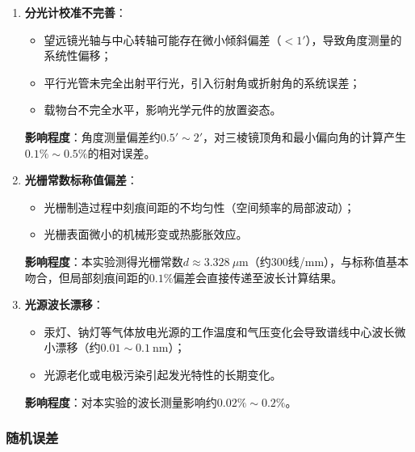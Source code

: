 \documentclass[11pt]{article}
\begin{document}
\begin{enumerate}
    \item \textbf{分光计校准不完善}：
    \begin{itemize}
        \item 望远镜光轴与中心转轴可能存在微小倾斜偏差（$< 1'$），导致角度测量的系统性偏移；
        \item 平行光管未完全出射平行光，引入衍射角或折射角的系统误差；
        \item 载物台不完全水平，影响光学元件的放置姿态。
    \end{itemize}
    \textbf{影响程度}：角度测量偏差约$0.5' \sim 2'$，对三棱镜顶角和最小偏向角的计算产生$0.1\% \sim 0.5\%$的相对误差。
    
    \item \textbf{光栅常数标称值偏差}：
    \begin{itemize}
        \item 光栅制造过程中刻痕间距的不均匀性（空间频率的局部波动）；
        \item 光栅表面微小的机械形变或热膨胀效应。
    \end{itemize}
    \textbf{影响程度}：本实验测得光栅常数$d \approx 3.328\ \mu\text{m}$（约300线/mm），与标称值基本吻合，但局部刻痕间距的$0.1\%$偏差会直接传递至波长计算结果。
    
    \item \textbf{光源波长漂移}：
    \begin{itemize}
        \item 汞灯、钠灯等气体放电光源的工作温度和气压变化会导致谱线中心波长微小漂移（约$0.01 \sim 0.1\ \text{nm}$）；
        \item 光源老化或电极污染引起发光特性的长期变化。
    \end{itemize}
    \textbf{影响程度}：对本实验的波长测量影响约$0.02\% \sim 0.2\%$。
\end{enumerate}

\subsubsection{随机误差}
\end{document}
